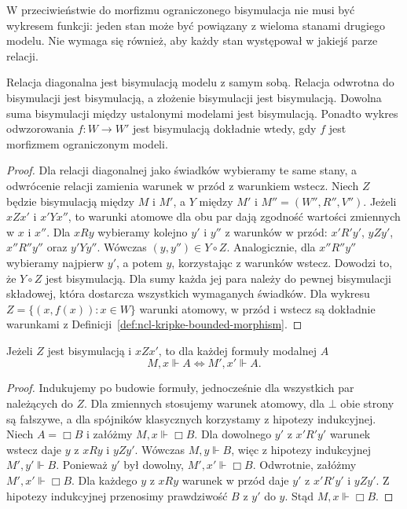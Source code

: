 W przeciwieństwie do morfizmu ograniczonego
bisymulacja nie musi być wykresem funkcji:
jeden stan może być powiązany z wieloma
stanami drugiego modelu. Nie wymaga się
również, aby każdy stan występował
w jakiejś parze relacji.

\begin{stwierdzenie}
\label{prop:ncl-kripke-bisimulation-laws}
Relacja diagonalna jest bisymulacją modelu
z samym sobą. Relacja odwrotna do bisymulacji
jest bisymulacją, a złożenie bisymulacji
jest bisymulacją. Dowolna suma bisymulacji
między ustalonymi modelami jest bisymulacją.
Ponadto wykres odwzorowania $f:W\to W'$
jest bisymulacją dokładnie wtedy, gdy $f$
jest morfizmem ograniczonym modeli.
\end{stwierdzenie}
\begin{proof}
Dla relacji diagonalnej jako świadków
wybieramy te same stany, a odwrócenie relacji
zamienia warunek w przód z warunkiem wstecz.
Niech $Z$ będzie bisymulacją między $M$ i $M'$,
a $Y$ między $M'$ i $M''=(W'',R'',V'')$.
Jeżeli $xZx'$ i $x'Yx''$, to warunki
atomowe dla obu par dają zgodność wartości
zmiennych w $x$ i $x''$.
Dla $xRy$ wybieramy kolejno $y'$ i $y''$
z warunków w przód: $x'R'y'$, $yZy'$,
$x''R''y''$ oraz $y'Yy''$. Wówczas
$(y,y'')\in Y\circ Z$. Analogicznie, dla
$x''R''y''$ wybieramy najpierw $y'$,
a potem $y$, korzystając z warunków wstecz.
Dowodzi to, że $Y\circ Z$ jest bisymulacją.
Dla sumy każda jej para należy do pewnej
bisymulacji składowej, która dostarcza
wszystkich wymaganych świadków.
Dla wykresu $Z=\{(x,f(x)):x\in W\}$
warunki atomowy, w przód i wstecz są
dokładnie warunkami z
Definicji~\ref{def:ncl-kripke-bounded-morphism}.
\end{proof}

\begin{twierdzenie}
\label{thm:ncl-kripke-bisimulation-invariance}
Jeżeli $Z$ jest bisymulacją i $xZx'$, to
dla każdej formuły modalnej $A$
\[
 M,x\Vdash A\iff M',x'\Vdash A.
\]
\end{twierdzenie}
\begin{proof}
Indukujemy po budowie formuły, jednocześnie
dla wszystkich par należących do $Z$.
Dla zmiennych stosujemy warunek atomowy,
dla $\bot$ obie strony są fałszywe,
a dla spójników klasycznych korzystamy
z hipotezy indukcyjnej.
Niech $A=\Box B$ i załóżmy $M,x\Vdash\Box B$.
Dla dowolnego $y'$ z $x'R'y'$ warunek
wstecz daje $y$ z $xRy$ i $yZy'$.
Wówczas $M,y\Vdash B$, więc z hipotezy
indukcyjnej $M',y'\Vdash B$.
Ponieważ $y'$ był dowolny, $M',x'\Vdash\Box B$.
Odwrotnie, załóżmy $M',x'\Vdash\Box B$.
Dla każdego $y$ z $xRy$ warunek w przód
daje $y'$ z $x'R'y'$ i $yZy'$.
Z hipotezy indukcyjnej przenosimy
prawdziwość $B$ z $y'$ do $y$.
Stąd $M,x\Vdash\Box B$.
\end{proof}

